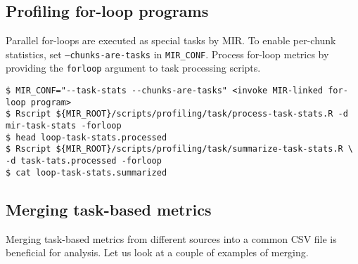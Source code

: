 \documentclass[11pt,a4paper]{article}
\begin{document}
\subsection{Profiling for-loop programs}

Parallel for-loops are executed as special tasks by MIR. To enable per-chunk statistics, set \texttt{--chunks-are-tasks} in \texttt{MIR\_CONF}. Process for-loop metrics by providing the \texttt{forloop} argument to task processing scripts.

\begin{lstlisting}[style=MyInputStyle]
$ MIR_CONF="--task-stats --chunks-are-tasks" <invoke MIR-linked for-loop program>
$ Rscript ${MIR_ROOT}/scripts/profiling/task/process-task-stats.R -d mir-task-stats -forloop
$ head loop-task-stats.processed
$ Rscript ${MIR_ROOT}/scripts/profiling/task/summarize-task-stats.R \
-d task-tats.processed -forloop
$ cat loop-task-stats.summarized
\end{lstlisting}

\subsection{Merging task-based metrics}
\label{sub:merging_task_based_metrics}

Merging task-based metrics from different sources into a common CSV file is beneficial for analysis. Let us look at a couple of examples of merging.
\end{document}
